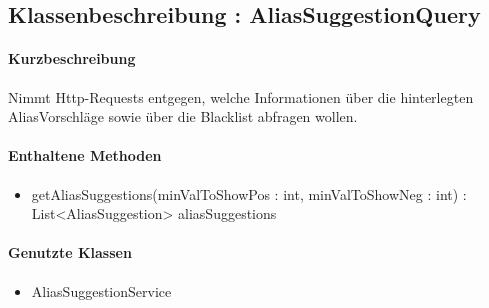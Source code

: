 \subsection{Klassenbeschreibung : AliasSuggestionQuery}%
\paragraph*{Kurzbeschreibung}
Nimmt Http-Requests entgegen, welche Informationen über die hinterlegten AliasVorschläge sowie über die Blacklist abfragen wollen.
\paragraph*{Enthaltene Methoden}
\begin{itemize}
    \item getAliasSuggestions(minValToShowPos : int, minValToShowNeg : int) : List<AliasSuggestion> aliasSuggestions
\end{itemize}
\paragraph*{Genutzte Klassen}
\begin{itemize}
    \item AliasSuggestionService
\end{itemize}
